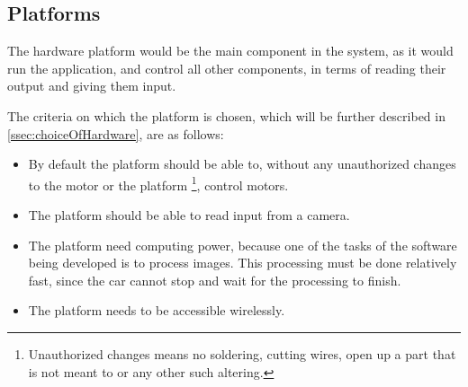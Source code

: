 \subsection{Platforms}\label{ssec:platforms}
The hardware platform would be the main component in the system, as it would run the application, and control all other components, in terms of reading their output and giving them input.

The criteria on which the platform is chosen, which will be further described in \autoref{ssec:choiceOfHardware}, are as follows:
\begin{itemize}
  \item By default the platform should be able to, without any unauthorized changes to the motor or the platform \footnote{Unauthorized changes means no soldering, cutting wires, open up a part that is not meant to or any other such altering.}, control motors.
  \item The platform should be able to read input from a camera.
  \item The platform need computing power, because one of the tasks of the software being developed is to process images. This processing must be done relatively fast, since the car cannot stop and wait for the processing to finish.
  \item The platform needs to be accessible wirelessly.
\end{itemize}
